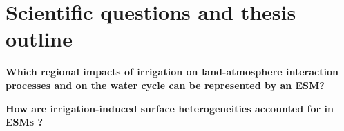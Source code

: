 
\section{Scientific questions and thesis outline}

\textbf{Which regional impacts of irrigation on land-atmosphere interaction processes and on the water cycle can be represented by an ESM?}

\textbf{How are irrigation-induced surface heterogeneities accounted for in ESMs ?}

% 



